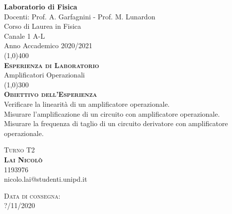 \documentclass[a4paper,11pt]{article}
\begin{document}
	\def\subsectionautorefname{Sezione} \def\subsubsectionautorefname{Sezione}




	\begin{titlepage}
		\begin{center}
			\Huge{\bfseries Laboratorio di Fisica}\\
				
			\LARGE Docenti: Prof. A. Garfagnini - Prof. M. Lunardon \\
			\Large Corso di Laurea in Fisica\\
			\Large Canale 1 A-L\\
			\Large Anno Accademico 2020/2021\\
			[1cm] \line(1,0){400}\\
			[2cm]
				
			\textsc{\huge{\bfseries  Esperienza di Laboratorio}}\\
			\huge{Amplificatori Operazionali}\\
			[2mm] \line(1,0){300}\\
			[3mm]

			\textsc{\Large{\bfseries  Obiettivo dell'Esperienza}}\\
			\large{Verificare la linearità di un amplificatore operazionale.\\
			Misurare l'amplificazione di un circuito con amplificatore operazionale.\\
			Misurare la frequenza di taglio di un circuito derivatore con amplificatore operazionale.}\\
			[8.cm]
			
			



		\end{center}
				
			\textsc{\Large Turno T2}\\
			[0.5cm] \textsc{\large {\bfseries Lai Nicolò}} \\ 
			\indent\large 1193976 \\ 
			\indent\large nicolo.lai@studenti.unipd.it\\
			
				
				
		\begin{flushright}
				\textsc{\Large Data di consegna:}\\
				\textsc{\large ?/11/2020}					
		\end{flushright}
				
	\end{titlepage}
\cleardoublepage
\end{document}
